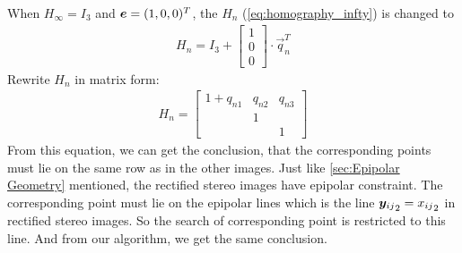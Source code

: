 When $H_\infty = I_3$ and $\boldsymbol{e} = (1, 0, 0)^T$, the $H_{n}$ (\cref{eq:homography_infty}) is changed to 
\begin{align}
	H_{n} = I_3 + \begin{bmatrix}1\\0\\0\end{bmatrix}\cdot \vec{q}_{n}^T
\end{align}
Rewrite $H_n$ in matrix form:
\begin{align}
H_n = \begin{bmatrix} 1+ q_{n1} & q_{n2}&q_{n3}\\
&1  & \\ 
&  &1\end{bmatrix}
\end{align}
From this equation, we can get the conclusion, that the corresponding points must lie on the same row as in the other images. Just like \cref{sec:Epipolar Geometry} mentioned, the rectified stereo images have epipolar constraint. The corresponding point must lie on the epipolar lines which is the line ${\boldsymbol{y}_{ij}}_2 = {x_{ij}}_2$ in rectified stereo images. So the search of corresponding point is restricted to this line. And from our algorithm, we get the same conclusion. 

